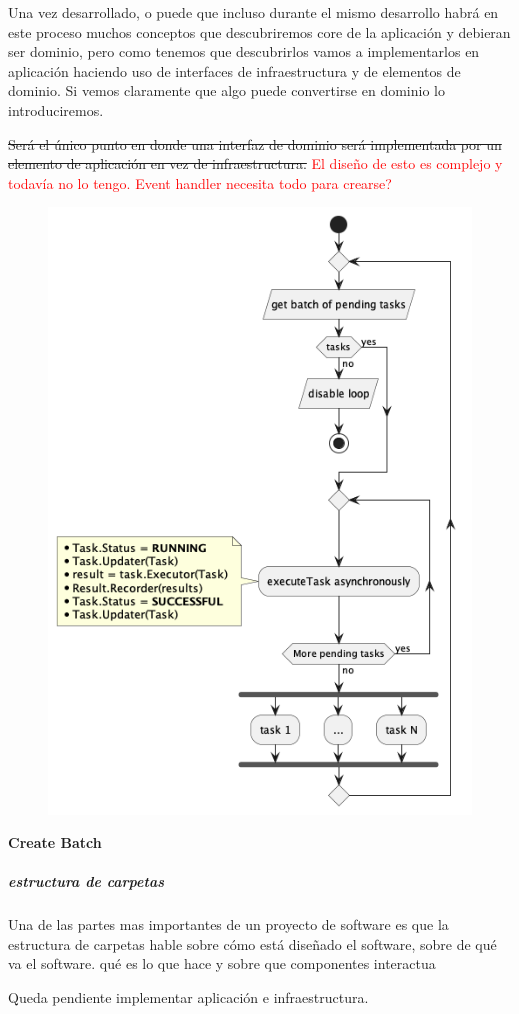 Una vez desarrollado, o puede que incluso durante el mismo desarrollo habrá en este proceso muchos conceptos que descubriremos core de la aplicación y debieran ser dominio, pero como tenemos que descubrirlos vamos a implementarlos en aplicación haciendo uso de interfaces de infraestructura y de elementos de dominio. Si vemos claramente que algo puede convertirse en dominio lo introduciremos.

\sout{Será el único punto en donde una interfaz de dominio será implementada por un elemento de aplicación en vez de infraestructura.} \textcolor{red}{El diseño de esto es complejo y todavía no lo tengo. Event handler necesita todo para crearse?}

\begin{figure}[H]
    \centering
    \includegraphics[height=0.3\textheight]{./part/Proyecto_ejecutivo/memoria_descriptiva/descripcionDelProyecto/manager/uml/executeTaskLoop}
    \caption[Diagrama de objetos de dominio]{}\label{fig:executeTaskLoop}
\end{figure}

\textbf{Create Batch}

\subparagraph{estructura de carpetas}

Una de las partes mas importantes de un proyecto de software es que la estructura de carpetas hable sobre cómo está diseñado el software, sobre de qué va el software. qué es lo que hace y sobre que componentes interactua



Queda pendiente implementar aplicación e infraestructura.
